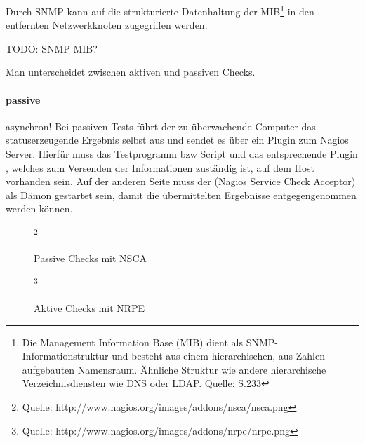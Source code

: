 Durch SNMP kann auf die strukturierte Datenhaltung der MIB\footnote{Die Management Information Base (MIB) dient als SNMP-Informationstruktur und besteht aus einem hierarchischen, aus Zahlen aufgebauten Namensraum. Ähnliche Struktur wie andere hierarchische Verzeichnisdiensten wie DNS oder LDAP. Quelle: \cite{Barth08} S.233} in den entfernten Netzwerkknoten zugegriffen werden.

\begin{center}
TODO: SNMP MIB?
\end{center}



Man unterscheidet zwischen aktiven und passiven Checks.
\paragraph{passive}
asynchron!
Bei passiven Tests führt der zu überwachende Computer das statuserzeugende Ergebnis selbst aus und sendet es über ein Plugin zum Nagios Server.
Hierfür muss das Testprogramm bzw Script und das entsprechende Plugin , welches zum Versenden der Informationen zuständig ist, auf dem Host vorhanden sein.
Auf der anderen Seite muss der  (Nagios Service Check Acceptor) als Dämon gestartet sein, damit die übermittelten Ergebnisse entgegengenommen werden können.
\begin{figure}[ht]
	\centering
		\caption{Passive Checks mit NSCA}\footnote{Quelle: http://www.nagios.org/images/addons/nsca/nsca.png}
		\label{passivchecks}
\end{figure}


\begin{figure}[ht]
	\centering
		\caption{Aktive Checks mit NRPE}\footnote{Quelle: http://www.nagios.org/images/addons/nrpe/nrpe.png}
		\label{aktivchecks}
\end{figure}

